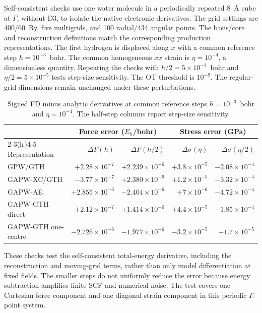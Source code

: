 \documentclass[10pt,a4paper]{article}
\begin{document}
Self-consistent checks use one water molecule in a periodically repeated 8~\AA{} cube at $\Gamma$, without D3, to isolate the native electronic derivatives. The grid settings are 400/60~Ry, five multigrids, and 100 radial/434 angular points. The basis/core and reconstruction definitions match the corresponding production representations. The first hydrogen is displaced along $x$ with a common reference step $h=10^{-3}$~bohr. The common homogeneous $xx$ strain is $\eta=10^{-4}$, a dimensionless quantity. Repeating the checks with $h/2=5\times10^{-4}$~bohr and $\eta/2=5\times10^{-5}$ tests step-size sensitivity. The OT threshold is $10^{-9}$. The regular-grid dimensions remain unchanged under these perturbations.

\begin{table}[htbp]
\centering\small
\caption{Signed FD minus analytic derivatives at common reference steps $h=10^{-3}$~bohr and $\eta=10^{-4}$. The half-step columns report step-size sensitivity.}
\label{tab:derivatives}
\begin{tabular}{lrrrr}
\toprule
& \multicolumn{2}{c}{Force error ($E_h$/bohr)} & \multicolumn{2}{c}{Stress error (GPa)}\\
\cmidrule(lr){2-3}\cmidrule(lr){4-5}
Representation & $\Delta F(h)$ & $\Delta F(h/2)$ & $\Delta\sigma(\eta)$ & $\Delta\sigma(\eta/2)$\\
\midrule
GPW/GTH & $+2.28\times10^{-7}$ & $+2.239\times10^{-6}$ & $+3.8\times10^{-5}$ & $-2.08\times10^{-4}$ \\
GAPW-XC/GTH & $-3.77\times10^{-7}$ & $+2.380\times10^{-6}$ & $+1.2\times10^{-5}$ & $-3.32\times10^{-4}$ \\
GAPW-AE & $+2.855\times10^{-6}$ & $-2.404\times10^{-6}$ & $+7\times10^{-6}$ & $-4.72\times10^{-4}$ \\
GAPW-GTH direct & $+2.12\times10^{-7}$ & $+1.414\times10^{-6}$ & $+4.4\times10^{-5}$ & $-1.85\times10^{-4}$ \\
GAPW-GTH one-centre & $-2.726\times10^{-6}$ & $-1.977\times10^{-6}$ & $-3.2\times10^{-5}$ & $-1.7\times10^{-5}$ \\
\bottomrule
\end{tabular}
\end{table}

These checks test the self-consistent total-energy derivative, including the reconstruction and moving-grid terms, rather than only model differentiation at fixed fields. The smaller steps do not uniformly reduce the error because energy subtraction amplifies finite SCF and numerical noise. The test covers one Cartesian force component and one diagonal strain component in this periodic $\Gamma$-point system.
\end{document}
